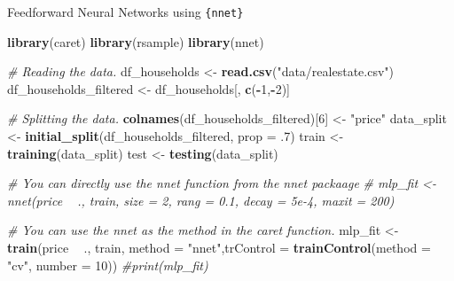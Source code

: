 \documentclass[12pt,ignorenonframetext,]{beamer}
\newenvironment{Shaded}{\begin{snugshade}}{\end{snugshade}}
\newcommand{\CommentTok}[1]{\textcolor[rgb]{0.56,0.35,0.01}{\textit{#1}}}
\newcommand{\DataTypeTok}[1]{\textcolor[rgb]{0.13,0.29,0.53}{#1}}
\newcommand{\DecValTok}[1]{\textcolor[rgb]{0.00,0.00,0.81}{#1}}
\newcommand{\FloatTok}[1]{\textcolor[rgb]{0.00,0.00,0.81}{#1}}
\newcommand{\KeywordTok}[1]{\textcolor[rgb]{0.13,0.29,0.53}{\textbf{#1}}}
\newcommand{\NormalTok}[1]{#1}
\newcommand{\OperatorTok}[1]{\textcolor[rgb]{0.81,0.36,0.00}{\textbf{#1}}}
\newcommand{\StringTok}[1]{\textcolor[rgb]{0.31,0.60,0.02}{#1}}
\begin{document}
\begin{frame}[fragile]{Feedforward Neural Networks using
\texttt{\{nnet\}}}
\protect\hypertarget{feedforward-neural-networks-using}{}

\tiny

\begin{Shaded}
\begin{Highlighting}[]
\KeywordTok{library}\NormalTok{(caret)}
\KeywordTok{library}\NormalTok{(rsample)}
\KeywordTok{library}\NormalTok{(nnet)}

\CommentTok{# Reading the data.}
\NormalTok{df_households <-}\StringTok{ }\KeywordTok{read.csv}\NormalTok{(}\StringTok{"data/realestate.csv"}\NormalTok{)}
\NormalTok{df_households_filtered <-}\StringTok{ }\NormalTok{df_households[, }\KeywordTok{c}\NormalTok{(}\OperatorTok{-}\DecValTok{1}\NormalTok{,}\OperatorTok{-}\DecValTok{2}\NormalTok{)]}

\CommentTok{# Splitting the data.}
\KeywordTok{colnames}\NormalTok{(df_households_filtered)[}\DecValTok{6}\NormalTok{] <-}\StringTok{ "price"}
\NormalTok{data_split <-}\StringTok{ }\KeywordTok{initial_split}\NormalTok{(df_households_filtered, }\DataTypeTok{prop =} \FloatTok{.7}\NormalTok{) }
\NormalTok{train <-}\StringTok{ }\KeywordTok{training}\NormalTok{(data_split)}
\NormalTok{test <-}\StringTok{ }\KeywordTok{testing}\NormalTok{(data_split)}

\CommentTok{# You can directly use the nnet function from the nnet packaage}
\CommentTok{# mlp_fit <- nnet(price ~ ., train, size = 2, rang = 0.1, decay = 5e-4, maxit = 200)}

\CommentTok{# You can use the nnet as the method in the caret function.}
\NormalTok{mlp_fit <-}\StringTok{ }\KeywordTok{train}\NormalTok{(price }\OperatorTok{~}\StringTok{ }\NormalTok{., train, }\DataTypeTok{method =} \StringTok{"nnet"}\NormalTok{,}\DataTypeTok{trControl =} \KeywordTok{trainControl}\NormalTok{(}\DataTypeTok{method =} \StringTok{"cv"}\NormalTok{,}
                                        \DataTypeTok{number =} \DecValTok{10}\NormalTok{))}
\CommentTok{#print(mlp_fit)}
\end{Highlighting}
\end{Shaded}

\normalsize

\end{frame}
\end{document}
